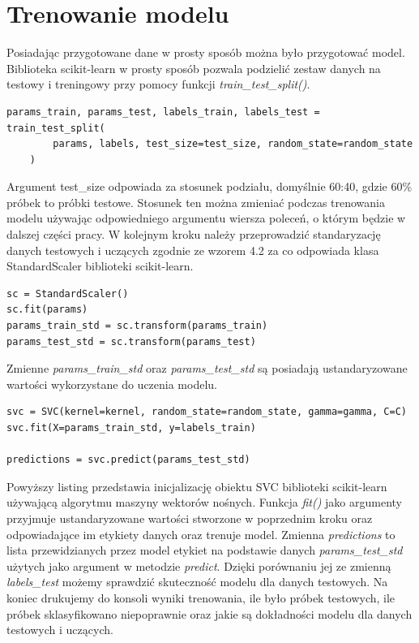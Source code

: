 \documentclass[printmode, eng, openany]{mgr}
\newcommand\tab[1][1cm]{\hspace*{#1}}
\begin{document}
\section{Trenowanie modelu}
\tab Posiadając przygotowane dane w prosty sposób można było przygotować model. Biblioteka scikit-learn w prosty sposób pozwala podzielić zestaw danych na testowy i treningowy przy pomocy funkcji \textit{train\_test\_split()}.
\begin{lstlisting}
params_train, params_test, labels_train, labels_test = train_test_split(
        params, labels, test_size=test_size, random_state=random_state
    )
\end{lstlisting}
\tab Argument test\_size odpowiada za stosunek podziału, domyślnie 60:40, gdzie 60\% próbek to próbki testowe. Stosunek ten można zmieniać podczas trenowania modelu używając odpowiedniego argumentu wiersza poleceń, o którym będzie w dalszej części pracy. W kolejnym kroku należy przeprowadzić standaryzację danych testowych i uczących zgodnie ze wzorem 4.2 za co odpowiada klasa StandardScaler biblioteki scikit-learn.
\begin{lstlisting}
sc = StandardScaler()
sc.fit(params)
params_train_std = sc.transform(params_train)
params_test_std = sc.transform(params_test)
\end{lstlisting}
\tab Zmienne \textit{params\_train\_std} oraz \textit{params\_test\_std} są posiadają ustandaryzowane wartości wykorzystane do uczenia modelu.

\begin{lstlisting}
svc = SVC(kernel=kernel, random_state=random_state, gamma=gamma, C=C)
svc.fit(X=params_train_std, y=labels_train)
    
predictions = svc.predict(params_test_std)
\end{lstlisting}
\tab Powyższy listing przedstawia inicjalizację obiektu SVC biblioteki scikit-learn używającą algorytmu maszyny wektorów nośnych. Funkcja \textit{fit()} jako argumenty przyjmuje ustandaryzowane wartości stworzone w poprzednim kroku oraz odpowiadające im etykiety danych oraz trenuje model. Zmienna \textit{predictions} to lista przewidzianych przez model etykiet na podstawie danych \textit{params\_test\_std} użytych jako argument w metodzie \textit{predict}. Dzięki porównaniu jej ze zmienną \textit{labels\_test} możemy sprawdzić skuteczność modelu dla danych testowych. Na koniec drukujemy do konsoli wyniki trenowania, ile było próbek testowych, ile próbek sklasyfikowano niepoprawnie oraz jakie są dokładności modelu dla danych testowych i uczących.
\end{document}
